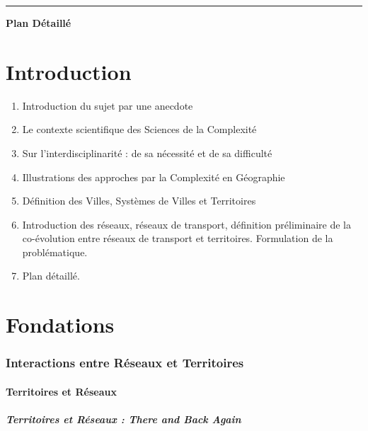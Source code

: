 \hrule

\vspace{0.5cm}

{\hfill
\Huge \textbf{Plan Détaillé}\hfill
}

\vspace{1.5cm}

\part*{Introduction}

\begin{enumerate}
	\item Introduction du sujet par une anecdote
	\item Le contexte scientifique des Sciences de la Complexité
	\item Sur l'interdisciplinarité : de sa nécessité et de sa difficulté
	\item Illustrations des approches par la Complexité en Géographie
	\item Définition des Villes, Systèmes de Villes et Territoires
	\item Introduction des réseaux, réseaux de transport, définition préliminaire de la co-évolution entre réseaux de transport et territoires. Formulation de la problématique.
	\item Plan détaillé.
\end{enumerate}



\part{Fondations}


\section{Interactions entre Réseaux et Territoires}

\subsection{Territoires et Réseaux}

\subsubsection{Territoires et Réseaux : \emph{There and Back Again}}

